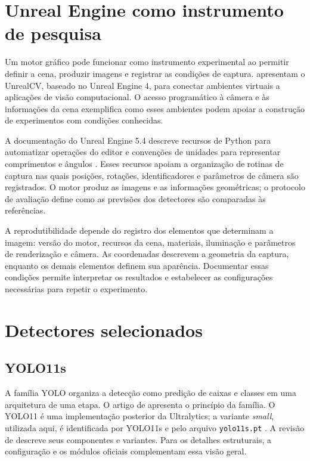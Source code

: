 \section{Unreal Engine como instrumento de pesquisa}
\label{sec:unreal-pesquisa}
Um motor gráfico pode funcionar como instrumento experimental ao permitir definir a cena, produzir imagens e registrar as condições de captura.  apresentam o UnrealCV, baseado no Unreal Engine 4, para conectar ambientes virtuais a aplicações de visão computacional. O acesso programático à câmera e às informações da cena exemplifica como esses ambientes podem apoiar a construção de experimentos com condições conhecidas.

A documentação do Unreal Engine 5.4 descreve recursos de Python para automatizar operações do editor \cite{epic2026python} e convenções de unidades para representar comprimentos e ângulos \cite{epic2026units}. Esses recursos apoiam a organização de rotinas de captura nas quais posições, rotações, identificadores e parâmetros de câmera são registrados. O motor produz as imagens e as informações geométricas; o protocolo de avaliação define como as previsões dos detectores são comparadas às referências.

A reprodutibilidade depende do registro dos elementos que determinam a imagem: versão do motor, recursos da cena, materiais, iluminação e parâmetros de renderização e câmera. As coordenadas descrevem a geometria da captura, enquanto os demais elementos definem sua aparência. Documentar essas condições permite interpretar os resultados e estabelecer as configurações necessárias para repetir o experimento.

\section{Detectores selecionados}
\subsection{YOLO11s}
A família YOLO organiza a detecção como predição de caixas e classes em uma arquitetura de uma etapa. O artigo de  apresenta o princípio da família. O YOLO11 é uma implementação posterior da Ultralytics; a variante \textit{small}, utilizada aqui, é identificada por YOLO11s e pelo arquivo \texttt{yolo11s.pt} \cite{ultralytics_yolo11_docs}. A revisão de  descreve seus componentes e variantes. Para os detalhes estruturais, a configuração e os módulos oficiais complementam essa visão geral.

